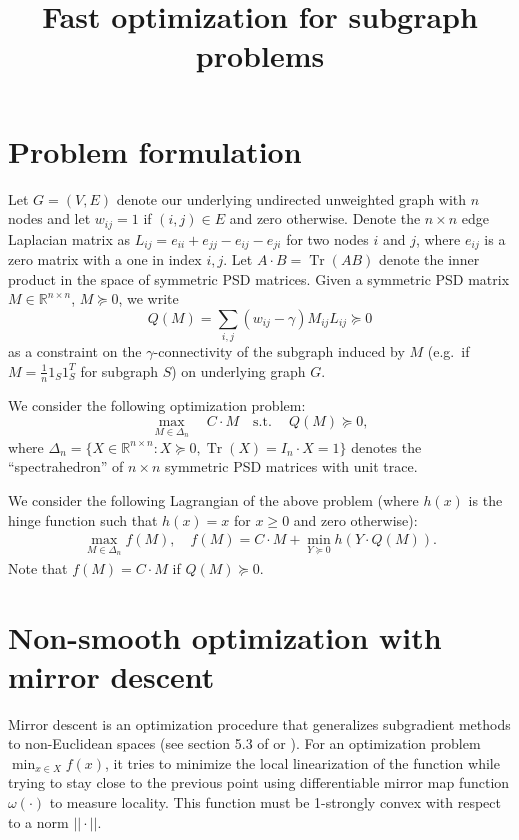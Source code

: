 \documentclass{article}
\DeclareMathOperator{\Tr}{Tr}
\begin{document}
\title{Fast optimization for subgraph problems}
\author{\vspace{-10pt}}

\maketitle

\section{Problem formulation}

Let $G = (V,E)$ denote our underlying undirected unweighted graph with $n$ nodes and let $w_{ij} = 1$ if $(i,j) \in E$ and zero otherwise. Denote the $n \times n$ edge Laplacian matrix as $L_{ij} = e_{ii} + e_{jj} - e_{ij} - e_{ji}$ for two nodes $i$ and $j$, where $e_{ij}$ is a zero matrix with a one in index $i,j$. Let $A \cdot B = \Tr(A B)$ denote the inner product in the space of symmetric PSD matrices. Given a symmetric PSD matrix $M \in \mathbb{R}^{n \times n}$, $M \succeq 0$, we write
\[ Q(M) = \sum_{i,j} (w_{ij} - \gamma) M_{ij} L_{ij} \succeq 0 \]
as a constraint on the $\gamma$-connectivity of the subgraph induced by $M$ (e.g.\ if $M = \frac{1}{n} 1_S 1_S^T$ for subgraph $S$) on underlying graph $G$.

We consider the following optimization problem:
\begin{equation}\label{eq:opt}
  \max_{M \in \Delta_n} \quad C \cdot M \quad \mathrm{s.t.\ } \quad Q(M) \succeq 0,
\end{equation}
where $\Delta_n = \{X \in \mathbb{R}^{n \times n} : X \succeq 0, \Tr(X) = I_n \cdot X = 1 \}$ denotes the ``spectrahedron'' of $n \times n$ symmetric PSD matrices with unit trace.

We consider the following Lagrangian of the above problem (where $h(x)$ is the hinge function such that $h(x) = x$ for $x \geq 0$ and zero otherwise):
\begin{align}\label{eq:opt2}
  \max_{M \in \Delta_n} f(M),\quad f(M) =  C \cdot M + \min_{Y \succeq 0}  h(Y \cdot Q(M)).
\end{align}
Note that $f(M) = C \cdot M$ if $Q(M) \succeq 0$.


\section{Non-smooth optimization with mirror descent}

Mirror descent is an optimization procedure that generalizes subgradient methods to non-Euclidean spaces (see section 5.3 of \cite{lectures} or \cite{blog}). For an optimization problem $\min_{x \in X} f(x)$, it tries to minimize the local linearization of the function while trying to stay close to the previous point using  differentiable mirror map function $\omega(\cdot)$ to measure locality. This function must be 1-strongly convex with respect to a norm $||\cdot||$.
\end{document}
